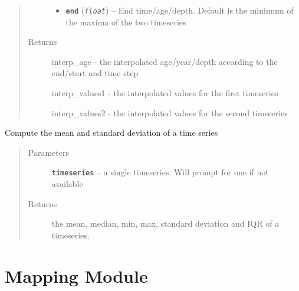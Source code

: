 \documentclass[letterpaper,10pt,english]{sphinxmanual}
\begin{document}
\begin{fulllineitems}
\begin{fulllineitems}
\begin{quote}
\begin{description}
\begin{itemize}
\item {} 
\textbf{\texttt{end}} (\emph{\texttt{float}}) -- End time/age/depth. Default is the minimum of the
maxima of the two timeseries

\end{itemize}

\item[{Returns}] \leavevmode

interp\_age - the interpolated age/year/depth according to
the end/start and time step

interp\_values1 - the interpolated values for the first timeseries

interp\_values2 - the interpolated values for the second timeseries


\end{description}\end{quote}

\end{fulllineitems}


\begin{fulllineitems}
\label{Basic:pyleoclim.Basic.simpleStats}
Compute the mean and standard deviation of a time series
\begin{quote}\begin{description}
\item[{Parameters}] \leavevmode
\textbf{\texttt{timeseries}} -- a single timeseries. Will prompt for one
if not available

\item[{Returns}] \leavevmode
the mean, median, min, max, standard deviation and IQR of a timeseries.

\end{description}\end{quote}

\end{fulllineitems}


\end{fulllineitems}



\chapter{Mapping Module}
\label{Mapping:mapping-module}\label{Mapping::doc}
\end{document}

